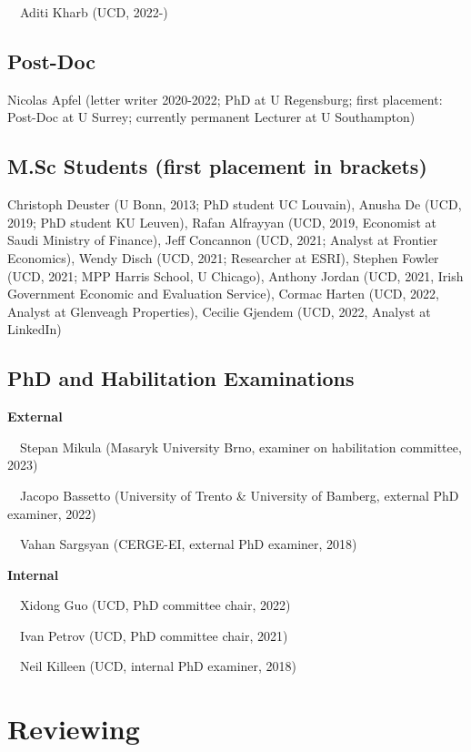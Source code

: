 \documentclass[10pt,a4paper,]{article}
\begin{document}
~~Aditi Kharb (UCD, 2022-)

\hypertarget{post-doc}{%
\subsection{Post-Doc}\label{post-doc}}

Nicolas Apfel (letter writer 2020-2022; PhD at U Regensburg; first
placement: Post-Doc at U Surrey; currently permanent Lecturer at U
Southampton)

\hypertarget{m.sc-students-first-placement-in-brackets}{%
\subsection{M.Sc Students (first placement in
brackets)}\label{m.sc-students-first-placement-in-brackets}}

Christoph Deuster (U Bonn, 2013; PhD student UC Louvain), Anusha De
(UCD, 2019; PhD student KU Leuven), Rafan Alfrayyan (UCD, 2019,
Economist at Saudi Ministry of Finance), Jeff Concannon (UCD, 2021;
Analyst at Frontier Economics), Wendy Disch (UCD, 2021; Researcher at
ESRI), Stephen Fowler (UCD, 2021; MPP Harris School, U Chicago), Anthony
Jordan (UCD, 2021, Irish Government Economic and Evaluation Service),
Cormac Harten (UCD, 2022, Analyst at Glenveagh Properties), Cecilie
Gjendem (UCD, 2022, Analyst at LinkedIn)

\hypertarget{phd-and-habilitation-examinations}{%
\subsection{PhD and Habilitation
Examinations}\label{phd-and-habilitation-examinations}}

\textbf{External}

~~Stepan Mikula (Masaryk University Brno, examiner on habilitation
committee, 2023)

~~Jacopo Bassetto (University of Trento \& University of Bamberg,
external PhD examiner, 2022)

~~Vahan Sargsyan (CERGE-EI, external PhD examiner, 2018)

\medskip

\textbf{Internal}

~~Xidong Guo (UCD, PhD committee chair, 2022)

~~Ivan Petrov (UCD, PhD committee chair, 2021)

~~Neil Killeen (UCD, internal PhD examiner, 2018)

\hypertarget{reviewing}{%
\section{Reviewing}\label{reviewing}}
\end{document}
